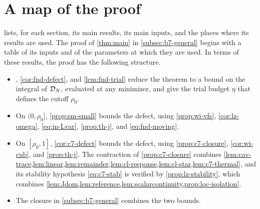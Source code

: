 \section{A map of the proof}\label{sec:overview-map}

 lists, for each section, its main results, its
main inputs, and the places where its results are used. The proof
of \cref{thm:main} in \cref{subsec:b7-general} begins with a table of
its inputs and of the parameters at which they are used. In terms of
these results, the proof has the following structure.
\begin{itemize}
\item {}, \cref{cor:fnd-defect}, and
\cref{lem:fnd-trial} reduce the theorem to a bound on the integral of
$\mathcal D_N$, evaluated at any minimizer, and give the trial budget $\eta$
that defines the cutoff $\rho_0$.
\item On $(0,\rho_0]$, \cref{prop:sm-small} bounds the defect, using
\cref{prop:wi-vfs}, \cref{cor:lz-omega}, \eqref{eq:in-Lvar},
\cref{prop:th-j}, and \eqref{eq:fnd-moving}.
\item On $[\rho_0,1]$, \cref{cor:c7-defect} bounds the defect, using
\cref{prop:c7-closure}, \cref{cor:wi-cub}, and \cref{prop:th-j}. The
contraction of \cref{prop:c7-closure} combines
\cref{lem:cav-trace,lem:linear,lem:remainder,lem:cl-response,lem:cl-star,lem:c7-thermal},
and its stability hypothesis \eqref{eq:c7-stab} is verified by
\cref{prop:lz-stability}, which combines
\cref{lem:Jdom,lem:reference,lem:scalarcontinuity,prop:loc-isolation}.
\item The closure in \cref{subsec:b7-general} combines the two bounds.
\end{itemize}

